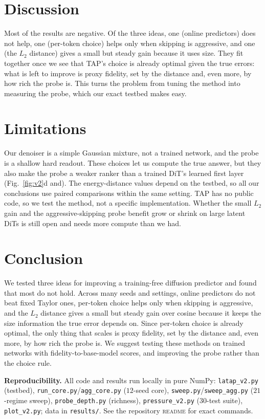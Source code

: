 \documentclass[10pt,twocolumn]{article}
\newcommand{\code}[1]{\texttt{\small #1}}
\begin{document}
\section{Discussion}
Most of the results are negative. Of the three ideas, one (online predictors) does not help,
one (per-token choice) helps only when skipping is aggressive, and one (the $L_2$ distance)
gives a small but steady gain because it uses size. They fit together once we see that TAP's
choice is already optimal given the true errors: what is left to improve is proxy fidelity,
set by the distance and, even more, by how rich the probe is. This turns the problem from
tuning the method into measuring the probe, which our exact testbed makes easy.

\section{Limitations}
Our denoiser is a simple Gaussian mixture, not a trained network, and the probe is a shallow
hard readout. These choices let us compute the true answer, but they also make the probe a
weaker ranker than a trained DiT's learned first layer (Fig.~\ref{fig:v2}d
and\cite{challagundla2025probe}). The energy-distance values depend on the testbed, so all
our conclusions use paired comparisons within the same setting. TAP has no public code, so we
test the method, not a specific implementation. Whether the small $L_2$ gain and the
aggressive-skipping probe benefit grow or shrink on large latent DiTs is still open and needs
more compute than we had.

\section{Conclusion}
We tested three ideas for improving a training-free diffusion predictor and found that most
do not hold. Across many seeds and settings, online predictors do not beat fixed Taylor
ones, per-token choice helps only when skipping is aggressive, and the $L_2$ distance gives a
small but steady gain over cosine because it keeps the size information the true error
depends on. Since per-token choice is already optimal, the only thing that scales is proxy
fidelity, set by the distance and, even more, by how rich the probe is. We suggest testing
these methods on trained networks with fidelity-to-base-model scores, and improving the
probe rather than the choice rule.

{\small\textbf{Reproducibility.} All code and results run locally in pure NumPy:
\code{latap\_v2.py} (testbed), \code{run\_core.py}/\code{agg\_core.py} ($12$-seed core),
\code{sweep.py}/\code{sweep\_agg.py} ($21$-regime sweep), \code{probe\_depth.py}
(richness), \code{pressure\_v2.py} ($30$-test suite), \code{plot\_v2.py}; data in
\code{results/}. See the repository \textsc{readme} for exact commands.}
\end{document}
